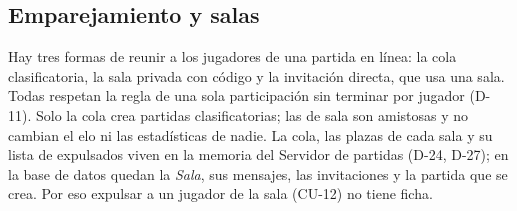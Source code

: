 \subsection*{Emparejamiento y salas}

Hay tres formas de reunir a los jugadores de una partida en línea: la cola clasificatoria, la sala privada con código y la invitación directa, que usa una sala. Todas respetan la regla de una sola participación sin terminar por jugador (\mbox{D-11}). Solo la cola crea partidas clasificatorias; las de sala son amistosas y no cambian el elo ni las estadísticas de nadie. La cola, las plazas de cada sala y su lista de expulsados viven en la memoria del Servidor de partidas (\mbox{D-24}, \mbox{D-27}); en la base de datos quedan la \textit{Sala}, sus mensajes, las invitaciones y la partida que se crea. Por eso expulsar a un jugador de la sala (\mbox{CU-12}) no tiene ficha.

